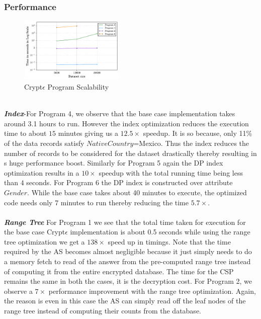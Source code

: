 \subsubsection{Performance}
\begin{figure}\includegraphics[width=5cm,height=3.1cm]{scalet.pdf} \caption{ Crypt$\epsilon$ Program Scalability} \end{figure}
\textit{\textbf{\\Index}}-For Program 4, we observe that the base case implementation takes around 3.1 hours to run. However the  index optimization reduces the execution time to about $15$ minutes  giving us a $12.5\times $ speedup. It is so because, only 11\% of the data records satisfy $NativeCountry$=Mexico. Thus the index reduces the number of records to be considered for the dataset drastically thereby resulting in s huge performance boost. Similarly for Program 5 again the DP index optimization results in a $10\times$ speedup with the total running time being less than $4$ seconds. For Program 6 the DP index is constructed over attribute $Gender$. While the base case takes about 40 minutes to execute, the optimized code needs only 7 minutes to run thereby reducing the time  $5.7\times$.\\\\\textit{\textbf{Range Tree}}
 For Program 1 we see that the total time taken for execution for the base case Crypt$\epsilon$ implementation is about 0.5 seconds while using the range tree optimization we get a $138\times$ speed up in timings. Note that the time required by the \textsf{AS} becomes almost negligible because it just simply needs to do a memory fetch to read of the answer from the pre-computed range tree instead of computing it from the entire encrypted database. The time for the \textsf{CSP} remains the same in both the cases, it is the decryption cost. For Program 2, we observe a $7\times$ performance improvement with the range tree optimization. Again, the reason is even in this case the \textsf{AS} can simply read off the leaf nodes of the range tree instead of computing their counts from the database. 
 
